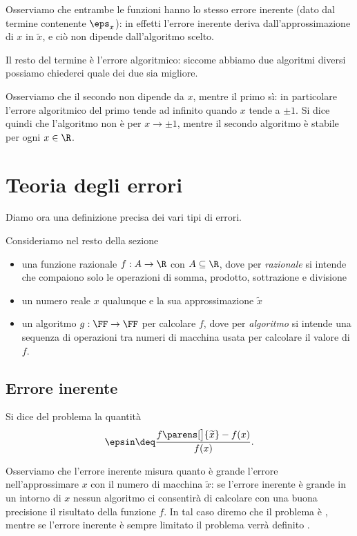 \begin{example}
Osserviamo che entrambe le funzioni hanno lo stesso errore inerente (dato dal termine contenente $\eps_x$): in effetti l'errore inerente deriva dall'approssimazione di $x$ in $\tilde x$, e ciò non dipende dall'algoritmo scelto.

Il resto del termine è l'errore algoritmico: siccome abbiamo due algoritmi diversi possiamo chiederci quale dei due sia migliore. 

Osserviamo che il secondo non dipende da $x$, mentre il primo sì: in particolare l'errore algoritmico del primo tende ad infinito quando $x$ tende a $\pm 1$. Si dice quindi che l'algoritmo non è  per $x \to \pm 1$, mentre il secondo algoritmo è stabile per ogni $x \in \R$. 
\end{example}

\section{Teoria degli errori}

Diamo ora una definizione precisa dei vari tipi di errori.

Consideriamo nel resto della sezione \begin{itemize}
    \item una funzione razionale $f : A \to \R$ con $A \subseteq \R$, dove per \emph{razionale} si intende che compaiono solo le operazioni di somma, prodotto, sottrazione e divisione
    \item un numero reale $x$ qualunque e la sua approssimazione $\tilde x$
    \item un algoritmo $g : \FF \to \FF$ per calcolare $f$, dove per \emph{algoritmo} si intende una sequenza di operazioni tra numeri di macchina usata per calcolare il valore di $f$.
\end{itemize}

\subsection{Errore inerente}

\begin{definition}
        Si dice  del problema la quantità \[
            \epsin \deq \frac{f\parens[\big]{\tilde x} - f(x)}{f(x)}.
        \]
\end{definition}

Osserviamo che l'errore inerente misura quanto è grande l'errore nell'approssimare $x$ con il numero di macchina $\tilde x$: se l'errore inerente è grande in un intorno di $x$ nessun algoritmo ci consentirà di calcolare con una buona precisione il risultato della funzione $f$. In tal caso diremo che il problema è , mentre se l'errore inerente è sempre limitato il problema verrà definito .

